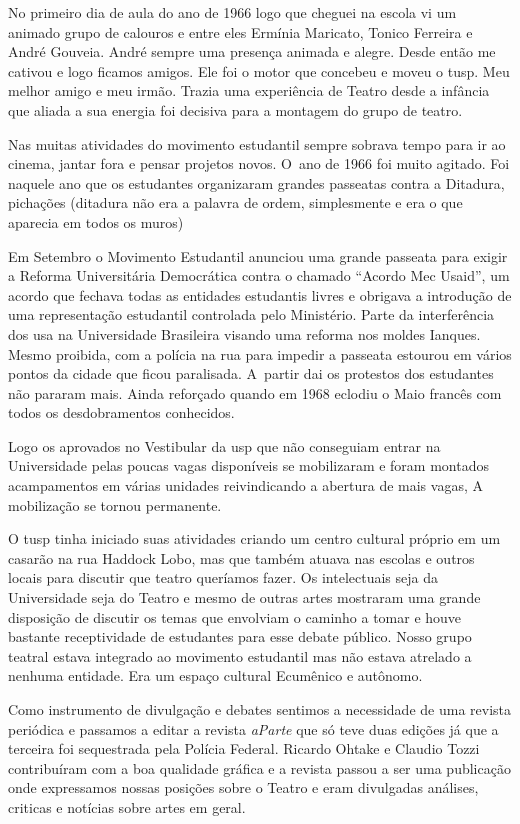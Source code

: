 No primeiro dia de aula do ano de 1966 logo que cheguei na escola vi um
animado grupo de calouros e entre eles Ermínia Maricato, Tonico Ferreira
e André Gouveia. André sempre uma presença animada e alegre. Desde então
me cativou e logo ficamos amigos. Ele foi o motor que concebeu e moveu o
{\sc tusp}. Meu melhor amigo e meu irmão. Trazia uma experiência de Teatro
desde a infância que aliada a sua energia foi decisiva para a montagem
do grupo de teatro.

Nas muitas atividades do movimento estudantil sempre sobrava tempo para
ir ao cinema, jantar fora e pensar projetos novos. O~ano de 1966 foi
muito agitado. Foi naquele ano que os estudantes organizaram grandes
passeatas contra a Ditadura, pichações ({\sc ditadura não} era a palavra de
ordem, simplesmente e era o que aparecia em todos os muros)

Em Setembro o Movimento Estudantil anunciou uma grande passeata para
exigir a Reforma Universitária Democrática contra o chamado “Acordo Mec
Usaid”, um acordo que fechava todas as entidades estudantis livres e
obrigava a introdução de uma representação estudantil controlada pelo
Ministério. Parte da interferência dos {\sc usa} na Universidade Brasileira
visando uma reforma nos moldes Ianques. Mesmo proibida, com a polícia na
rua para impedir a passeata estourou em vários pontos da cidade que
ficou paralisada. A~partir dai os protestos dos estudantes não pararam
mais. Ainda reforçado quando em 1968 eclodiu o Maio francês com todos os
desdobramentos conhecidos.

Logo os aprovados no Vestibular da {\sc usp} que não conseguiam entrar na
Universidade pelas poucas vagas disponíveis se mobilizaram e foram
montados acampamentos em várias unidades reivindicando a abertura de
mais vagas, A mobilização se tornou permanente.

O {\sc tusp} tinha iniciado suas atividades criando um centro cultural próprio
em um casarão na rua Haddock Lobo, mas que também atuava nas escolas e
outros locais para discutir que teatro queríamos fazer. Os intelectuais
seja da Universidade seja do Teatro e mesmo de outras artes mostraram
uma grande disposição de discutir os temas que envolviam o caminho a
tomar e houve bastante receptividade de estudantes para esse debate
público. Nosso grupo teatral estava integrado ao movimento estudantil
mas não estava atrelado a nenhuma entidade. Era um espaço cultural
Ecumênico e autônomo.

Como instrumento de divulgação e debates sentimos a necessidade de uma
revista periódica e passamos a editar a revista {\it aParte} que só teve
duas edições já que a terceira foi sequestrada pela Polícia Federal.
Ricardo Ohtake e Claudio Tozzi contribuíram com a boa qualidade gráfica
e a revista passou a ser uma publicação onde expressamos nossas posições
sobre o Teatro e eram divulgadas análises, criticas e notícias sobre
artes em geral.

